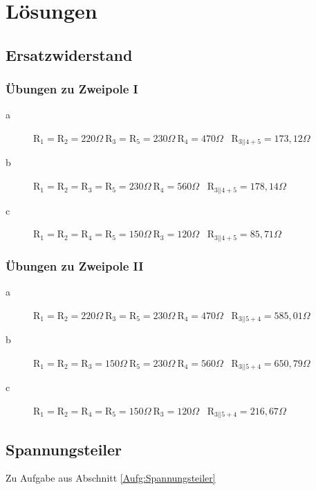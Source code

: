 \section{Lösungen}
\subsection{Ersatzwiderstand}
\label{lsg:Ersatzwiderstand}
\subsubsection{Übungen zu Zweipole I}
\begin{description}
  \item[a] $\text{R}_1 = \text{R}_2 = 220 \Omega \ \text{R}_3 = \text{R}_5 = 230 \Omega \ \text{R}_4 = 470 \Omega$ \ $\text{R}_{3||4+5} = 173,12 \Omega$
  \item[b] $\text{R}_1 = \text{R}_2 = \text{R}_3 = \text{R}_5 = 230 \Omega \ \text{R}_4 = 560 \Omega$ \ $\text{R}_{3||4+5} = 178,14 \Omega$
  \item[c] $\text{R}_1 = \text{R}_2 = \text{R}_4 = \text{R}_5 = 150 \Omega \ \text{R}_3 = 120 \Omega$ \ $\text{R}_{3||4+5} = 85,71 \Omega$
\end{description}
\subsubsection{Übungen zu Zweipole II}
\begin{description}
  \item[a] $\text{R}_1 = \text{R}_2 = 220 \Omega \ \text{R}_3 = \text{R}_5 = 230 \Omega \ \text{R}_4 = 470 \Omega$ \ $\text{R}_{3||5+4} = 585,01 \Omega$
  \item[b] $\text{R}_1 = \text{R}_2 = \text{R}_3 = 150 \Omega \ \text{R}_5 = 230 \Omega \ \text{R}_4 = 560 \Omega$ \ $\text{R}_{3||5+4} =  650,79\Omega$
  \item[c] $\text{R}_1 = \text{R}_2 = \text{R}_4 = \text{R}_5 = 150 \Omega \ \text{R}_3 = 120 \Omega$ \ $\text{R}_{3||5+4} =  216,67\Omega$
\end{description}


\subsection{Spannungsteiler}
\label{Lsg:Spannungsteiler}
Zu Aufgabe aus Abschnitt \ref{Aufg:Spannungsteiler}

